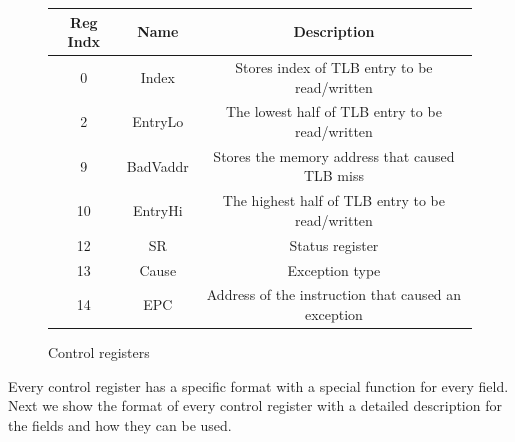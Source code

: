 \documentclass[oneside]{book}
\begin{document}
\begin{figure}[H]
\begin{center}
\resizebox{0.9\textwidth}{!} {
\begin{tabular}{|c|c|c|}

\hline \textbf{Reg Indx} & \textbf{Name}  & \textbf{Description} \\

\hline 0     & Index    & Stores index of TLB entry to be read/written \\

\hline 2     & EntryLo  & The lowest half of TLB entry to be read/written \\

\hline 9     & BadVaddr & Stores the memory address that caused TLB miss \\

\hline 10    & EntryHi  & The highest half of TLB entry to be read/written \\

\hline 12    & SR       & Status register \\

\hline 13    & Cause    & Exception type \\

\hline 14    & EPC      & Address of the instruction that caused an exception\\

\hline

\end{tabular}
}

\end{center}
\caption{Control registers}
\label{ctrlregs}
\end{figure}

Every control register has a specific format with a special function
for every field. Next we show the format of every control register
with a detailed description for the fields and how they can be used.\\
\end{document}
